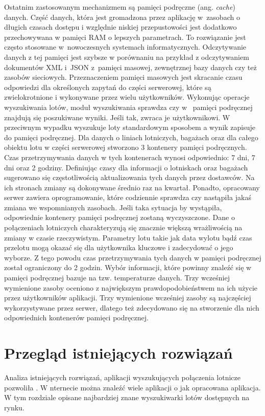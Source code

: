 \documentclass[12pt, twoside]{report}
\begin{document}
Ostatnim zastosowanym mechanizmem są pamięci podręczne (ang. \emph{cache}) danych. Część danych, która jest gromadzona przez aplikację w~zasobach o długich czasach dostępu i względnie niskiej przepustowości jest dodatkowo przechowywana w pamięci RAM o lepszych parametrach\cite{ehcache}. To rozwiązanie jest często stosowane w~nowoczesnych systemach informatycznych. Odczytywanie danych z tej pamięci jest szybsze w porównaniu na przykład z odczytywaniem dokumentów XML i~JSON z~pamięci masowej, zewnętrznej bazy danych czy też zasobów sieciowych. Przeznaczeniem pamięci masowych jest skracanie czasu odpowiedzi dla określonych zapytań do części serwerowej, które są zwielokrotnione i wykonywane przez wielu użytkowników. Wykonując operacje wyszukiwania lotów, moduł wyszukiwania sprawdza czy w  ~pamięci podręcznej znajdują się poszukiwane wyniki. Jeśli tak, zwraca je użytkownikowi. W przeciwnym wypadku  wyszukuje loty standardowym sposobem a wynik zapisuje do pamięci podręcznej. Dla danych o liniach lotniczych, bagażach oraz dla całego obiektu lotu w części serwerowej stworzono 3 kontenery pamięci podręcznych. Czas przetrzymywania danych w tych kontenerach wynosi odpowiednio: 7 dni, 7 dni oraz 2 godziny. Definiując czasy dla informacji o lotniskach oraz bagażach sugerowano się częstotliwością aktualizowania tych danych przez dostawców. Na ich stronach zmiany są dokonywane średnio raz na kwartał. Ponadto, opracowany serwer zawiera oprogramowanie, które codziennie sprawdza czy nastąpiła jakaś zmiana we wspomnianych zasobach. Jeśli taka sytuacja by wystąpiła, odpowiednie kontenery pamięci podręcznej zostaną wyczyszczone. Dane o połączeniach lotniczych charakteryzują się znacznie większą wrażliwością na zmiany w czasie rzeczywistym. Parametry lotu takie jak data wylotu bądź czas przelotu mogą okazać się dla użytkownika kluczowe i zadecydować o jego wyborze. Z tego powodu czas przetrzymywania tych danych w pamięci podręcznej został ograniczony do 2 godzin. 
Wybór informacji, które powinny znaleźć się w pamięci podręcznej bazuje na tzw. temperaturze danych. Trzy wcześniej wymienione zasoby oceniono z największym prawdopodobieństwem na ich użycie przez użytkowników aplikacji. 
Trzy wymienione wcześniej zasoby są najczęściej wykorzystywane przez serwer, dlatego też zdecydowano się na stworzenie dla nich odpowiednich kontenerów pamięci podręcznej.

\chapter{Przegląd istniejących rozwiązań}
Analiza istniejących rozwiązań,  aplikacji wyszukujących połączenia lotnicze pozwoliła . W nternecie można znaleźć wiele aplikacji o jak opracowana aplikacja. W tym rozdziale  opisane  najbardziej znane wyszukiwarki lotów dostępnych na rynku. 
\end{document}
